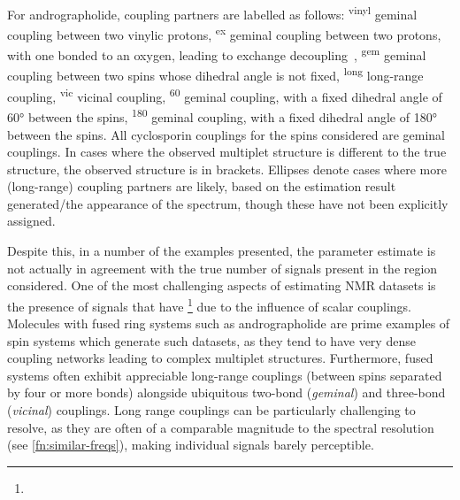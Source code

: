 \begin{table}
{    For andrographolide, coupling partners are labelled as follows:
    \textsuperscript{vinyl} geminal coupling between two vinylic protons,
    \textsuperscript{ex} geminal coupling between two protons, with one
    bonded to an oxygen, leading to exchange decoupling~\cite[Section
    2.6.1.5]{Claridge2016},
    \textsuperscript{gem} geminal coupling between two spins whose dihedral
    angle is not fixed,
    \textsuperscript{long} long-range coupling,
    \textsuperscript{vic} vicinal coupling,
    \textsuperscript{60} geminal coupling, with a fixed dihedral angle of
    \ang{60} between the spins,
    \textsuperscript{180} geminal coupling, with a fixed dihedral angle of
    \ang{180} between the spins.
    All cyclosporin couplings for the spins considered are geminal couplings.
    In cases where the observed multiplet structure is different to the true
    structure, the observed structure is in brackets. Ellipses denote cases
    where more (long-range) coupling partners are likely, based on the
    estimation result generated/the appearance of the spectrum, though these
    have not been explicitly assigned.
}
\label{tab:andro-multiplets}
\end{table}

Despite this, in a number of the examples presented, the parameter estimate is
not actually in agreement with the true number of signals present in the region
considered. One of the most challenging aspects of estimating \ac{NMR} datasets
is the presence of signals that have \footnote{
}
due to the influence of scalar couplings.
Molecules with fused ring systems such as andrographolide are prime examples of spin
systems which generate such datasets, as they tend to have very dense coupling
networks leading to complex multiplet structures. Furthermore, fused systems often
exhibit appreciable long-range couplings (between spins separated by four or
more bonds) alongside ubiquitous two-bond (\emph{geminal}) and three-bond
(\emph{vicinal}) couplings. Long range couplings can be particularly challenging to
resolve, as they are often of a comparable magnitude to the spectral resolution
(see \cref{fn:similar-freqs}), making individual signals barely perceptible.


